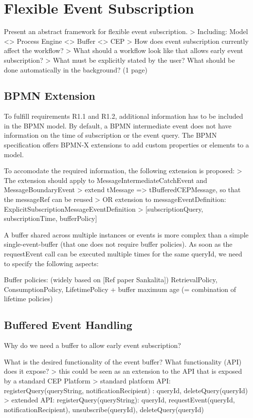 \chapter{Flexible Event Subscription}\label{ch:flexibleeventsubscription}

Present an abstract framework for flexible event subscription.
> Including: Model <> Process Engine <> Buffer <> CEP
> How does event subscription currently affect the workflow?
> What should a workflow look like that allows early event subscription?
> What must be explicitly stated by the user? What should be done automatically in the background?
(1 page)

\section{BPMN Extension}
To fulfill requirements R1.1 and R1.2, additional information has to be included in the BPMN model. By default, a BPMN intermediate event does not have information on the time of subscription or the event query. 
The BPMN specification offers BPMN-X extensions to add custom properties or elements to a model.

To accomodate the required information, the following extension is proposed:
> The extension should apply to MessageIntermediateCatchEvent and MessageBoundaryEvent
> extend tMessage => tBufferedCEPMessage, so that the messageRef can be reused
> OR extension to messageEventDefinition: ExplicitSubscriptionMessageEventDefinition
> [subscriptionQuery, subscriptionTime, bufferPolicy]

A buffer shared across multiple instances or events is more complex than a simple single-event-buffer (that one does not require buffer policies). As soon as the requestEvent call can be executed multiple times for the same queryId, we need to specify the following aspects:

Buffer policies:
(widely based on [Ref paper Sankalita]) RetrievalPolicy, ConsumptionPolicy, LifetimePolicy
+ buffer maximum age (= combination of lifetime policies)

\section{Buffered Event Handling}
Why do we need a buffer to allow early event subscription?

What is the desired functionality of the event buffer? What functionality (API) does it expose?
> this could be seen as an extension to the API that is exposed by a standard CEP Platform
> standard platform API: registerQuery(queryString, notificationRecipient) : queryId, deleteQuery(queryId)
> extended API: registerQuery(queryString): queryId, requestEvent(queryId, notificationRecipient), unsubscribe(queryId), deleteQuery(queryId)




